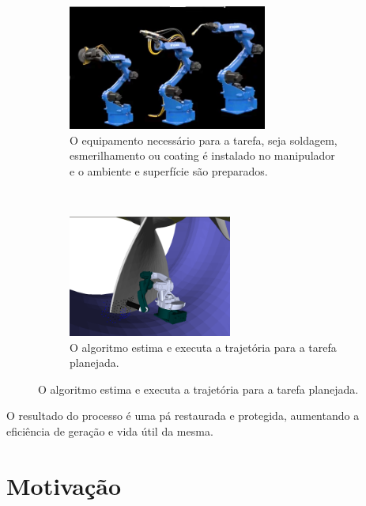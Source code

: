 \begin{figure}[H]
\ContinuedFloat
\begin{subfigure}{0.5\textwidth}
\includegraphics[width=0.9\linewidth, height=4.1cm]{figs/robots_evo} 
\captionsetup{width=0.9\textwidth}
\caption{O equipamento necessário para a tarefa, seja soldagem, esmerilhamento
ou coating é instalado no manipulador e o ambiente e superfície são preparados.}
\end{subfigure}
~~~
\begin{subfigure}{0.5\textwidth}
\label{fig:subim2}
\includegraphics[width=0.9\linewidth, height=4cm]{figs/footleft}
\captionsetup{width=0.9\textwidth}
\caption{O algoritmo estima e executa a trajetória para a tarefa planejada.}
\end{subfigure}
 \label{fig:image2}
\end{figure}

O resultado do processo é uma pá restaurada e protegida, aumentando a eficiência
de geração e vida útil da mesma. 

\section{Motivação}

